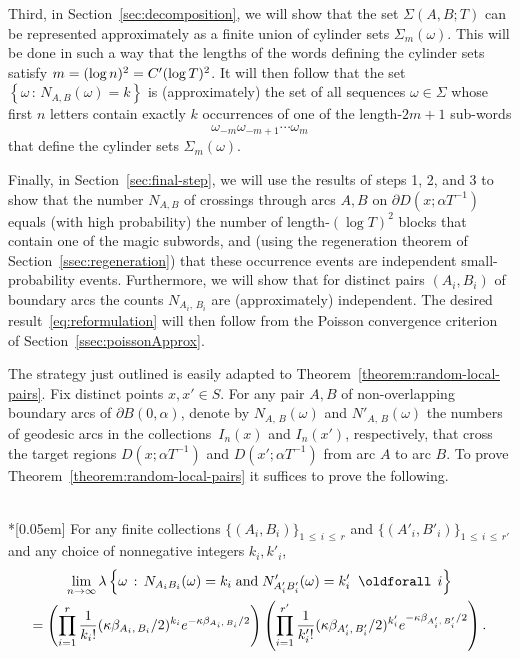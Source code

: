 \documentclass[10pt]{amsart}
\theoremstyle{definition}\newtheorem{defi}[theo]{Definition}\newtheorem{rema}[theo]{Remark}\newtheorem{exam}[theo]{Example}\newtheorem{exem}[theo]{Example}\newtheorem{nota}[theo]{Notation}
\newcommand{\xset}[1]{\left\{ #1 \right\}}
\renewcommand*{\forall}{\mathrel{\oldforall}}
\begin{document}
Third, in Section~\ref{sec:decomposition}, we will show that the set $\Sigma (A,B;T)$ can be represented approximately as a finite union of cylinder sets $\Sigma_{m}(\omega)$. This will be done in such a way that the lengths of the words defining the cylinder sets satisfy $m= (\log n)^{2}\linebreak=C' (\log T)^{2}$. It will then follow that the set $\xset {\omega \,:\, N_{A,B}(\omega)=k}$ is (approximately) the set of all sequences $\omega \in \Sigma$ whose first $n$ letters contain exactly $k$ occurrences of one of the length-$2m+1$ sub-words
\begin{equation}\label{eq:magic-subword}
\omega_{-m}\omega_{-m+1} \cdots \omega_{m}
\end{equation}
that define the cylinder sets $\Sigma_{m}(\omega)$.

Finally, in Section~\ref{sec:final-step}, we will use the results of steps 1, 2, and 3 to show that the number $N_{A,B} $ of crossings through arcs $A,B$ on $\partial D(x;\alpha T^{-1})$ equals (with high probability) the number of length-$(\log T)^{2}$ blocks that contain one of the magic subwords, and (using the regeneration theorem of Section~\ref{ssec:regeneration}) that these occurrence events are independent small-probability events. Furthermore, we will show that for distinct pairs $(A_{i},B_{i})$ of boundary arcs the counts $N_{A_{i},\,B_{i}}$ are (approximately) independent. The desired result~\eqref{eq:reformulation} will then follow from the Poisson convergence criterion of Section~\ref{ssec:poissonApprox}.

The strategy just outlined is easily adapted to Theorem~\ref{theorem:random-local-pairs}. Fix distinct points $x,x'\in S$. For any pair $A,B$ of non-overlapping boundary arcs of $\partial B (0,\alpha)$, denote by $N_{A,\,B} (\omega)$ and $N'_{A,\,B} (\omega)$ the numbers of geodesic arcs in the collections~$I_{n} (x)$ and $I_{n} (x')$, respectively, that cross the target regions $D(x;\alpha T^{-1})$ and $D(x';\alpha T^{-1})$ from arc $A$ to arc $B$. To prove Theorem~\ref{theorem:random-local-pairs} it suffices to prove the following.

\begin{prop}\label{proposition:reformulation-pairs}\ \\*[0.05em]
For any finite collections $\{(A_{i},B_{i}) \}_{1\,\leq\,i\,\leq\,r}$ and $\{(A'_{i},B'_{i}) \}_{1\,\leq\,i\,\leq\,r'}$ and any choice of nonnegative integers $k_{i},k'_{i}$,
\begin{multline}\label{eq:reformulation-pairs}
\lim_{n \rightarrow \infty} \lambda \left\{\omega \,:\, N_{A_{i}B_{i}} (\omega)=k_{i} \;\text{and}\; N'_{A'_{i}B'_{i}} (\omega)=k'_{i} \; \forall
\,i\right\}\\
=\left(\prod_{i=1}^{r} \frac{1}{k_{i}!} (\kappa \beta_{A_{i},\,B_{i}}/2)^{k_{i}} e^{- \kappa \beta_{A_{i},\,B_{i}}/2} \right) \left(\prod_{i=1}^{r'} \frac{1}{k'_{i}!}(\kappa
\beta_{A'_{i},\,B'_{i}}/2)^{k'_{i}} e^{- \kappa \beta_{A'_{i},\,B'_{i}}/2} \right).
\end{multline}
\end{prop}
\end{document}

